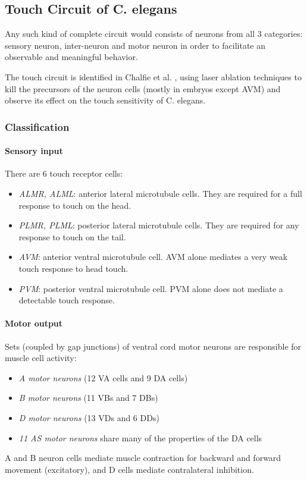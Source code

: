 \subsection{Touch Circuit of C. elegans}
\label{section: touch-circuit}

Any such kind of complete circuit would consists of neurons from all 3 categories: sensory neuron, inter-neuron and motor neuron in order to facilitate an observable and
meaningful behavior.

The touch circuit is identified in Chalfie et al. \cite{chalfie_neural_1985}, using laser ablation techniques to kill the precursors of the neuron cells (mostly in
embryos except AVM) and observe its effect on the touch sensitivity of C. elegans.

\subsubsection{Classification}
\paragraph{Sensory input}
There are 6 touch receptor cells:
\begin{itemize}
  \item \emph{ALMR, ALML}: anterior lateral microtubule cells. They are required for a full response to touch on the head.
  \item \emph{PLMR, PLML}: posterior lateral microtubule cells. They are required for any response to touch on the tail.
  \item \emph{AVM}: anterior ventral microtubule cell. AVM alone mediates a very weak touch response to head touch.
  \item \emph{PVM}: posterior ventral microtubule cell. PVM alone does not mediate a detectable touch response.
\end{itemize}

\paragraph{Motor output} 
Sets (coupled by gap junctions) of ventral cord motor neurons are responsible for muscle cell activity: \cite{white_structure_1986}
\begin{itemize}
  \item \emph{A motor neurons} (12 VA cells and 9 DA cells)
  \item \emph{B motor neurons} (11 VBs and 7 DBs)
  \item \emph{D motor neurons} (13 VDs and 6 DDs)
  \item \emph{11 AS motor neurons} share many of the properties of the DA cells
\end{itemize}
A and B neuron cells mediate muscle contraction for backward and forward movement (excitatory), and D cells mediate contralateral inhibition.

